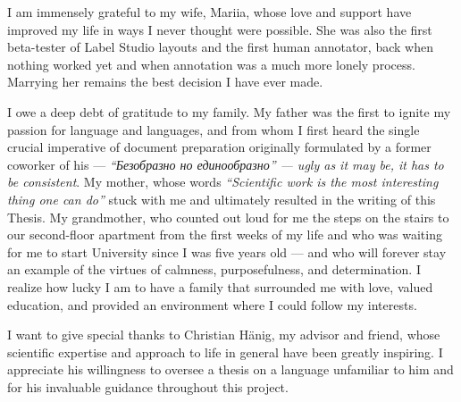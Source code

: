 \documentclass[
11pt, %
oneside, %
english, %
singlespacing, %
headsepline, %
chapterinoneline, %
]{MastersDoctoralThesis} %
\begin{document}
\begin{acknowledgements}




I am immensely grateful to my wife, Mariia, whose love and support have improved my life in ways I never thought were possible. 
She was also the first beta-tester of Label Studio layouts and the first human annotator, back when nothing worked yet and when annotation was a much more lonely process. 
Marrying her remains the best decision I have ever made. 

I owe a deep debt of gratitude to my family. My father was the first to ignite my passion for language and languages, and from whom I first heard the single crucial imperative of document preparation originally formulated by a former coworker of his — \textit{\enquote{Безобразно но единообразно} — ugly as it may be, it has to be consistent}. My mother, whose words \textit{\enquote{Scientific work is the most interesting thing one can do}} stuck with me and ultimately resulted in the writing of this Thesis. 
My grandmother, 
who counted out loud for me the steps on the stairs to our second-floor apartment from the first weeks of my life and who was waiting for me to start University since I was five years old — and who will forever stay an example of the virtues of calmness, purposefulness, and determination. 
I realize how lucky I am to have a family that surrounded me with love, valued education, and provided an environment where I could follow my interests.

I want to give special thanks to Christian Hänig, my advisor and friend, whose scientific expertise and approach to life in general have been greatly inspiring. I appreciate his willingness to oversee a thesis on a language unfamiliar to him and for his invaluable guidance throughout this project.


\end{acknowledgements}
\end{document}
